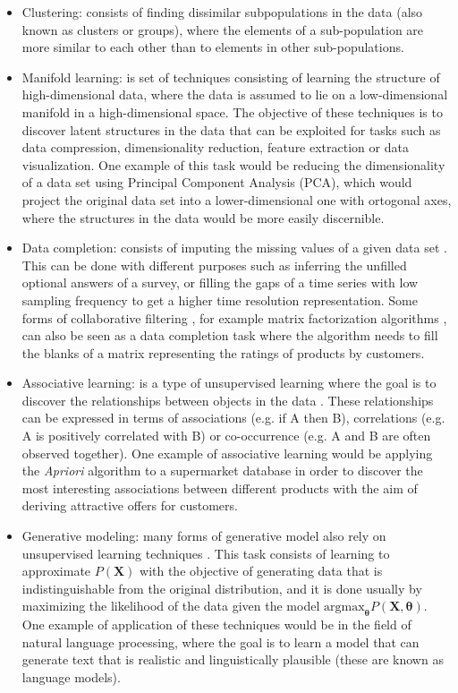 \begin{itemize}
	\item Clustering: consists of finding dissimilar subpopulations in the data (also known as clusters or groups), where the elements of a sub-population are more similar to each other than to elements in other sub-populations.
	\item Manifold learning: is set of techniques consisting of learning the structure of high-dimensional data, where the data is assumed to lie on a low-dimensional manifold in a high-dimensional space. The objective of these techniques is to discover latent structures in the data that can be exploited for tasks such as data compression, dimensionality reduction, feature extraction or data visualization. One example of this task would be reducing the dimensionality of a data set using Principal Component Analysis (PCA), which would project the original data set into a lower-dimensional one with ortogonal axes, where the structures in the data would be more easily discernible.
	\item Data completion: consists of imputing the missing values of a given data set \cite{vanburen_2018}. This can be done with different purposes such as inferring the unfilled optional answers of a survey, or filling the gaps of a time series with low sampling frequency to get a higher time resolution representation. Some forms of collaborative filtering \cite{falk2019}, for example matrix factorization algorithms \cite{koren2009}, can also be seen as a data completion task where the algorithm needs to fill the blanks of a matrix representing the ratings of products by customers.
	\item Associative learning:  is a type of unsupervised learning where the goal is to discover the relationships between objects in the data \cite{zhang2002}. These relationships can be expressed in terms of associations (e.g. if A then B), correlations (e.g. A is positively correlated with B) or co-occurrence (e.g. A and B are often observed together). One example of associative learning would be applying the \textit{Apriori} algorithm \cite{agrawal1996} to a supermarket database in order to discover the most interesting associations between different products with the aim of deriving attractive offers for customers. 
	\item Generative modeling: many forms of generative model also rely on unsupervised learning techniques \cite{bishop2006}. This task consists of learning to approximate $P(\mathbf{X})$ with the objective of generating data that is indistinguishable from the original distribution, and it is done usually by maximizing the likelihood of the data given the model $\mathrm{argmax}_\mathbf{\theta} P(\mathbf{\mathbf{X},\mathbf{\theta}})$.  One example of application of these techniques would be in the field of natural language processing, where the goal is to learn a model that can generate text \cite{uday2019} that is realistic and linguistically plausible (these are known as language models). 
\end{itemize}



